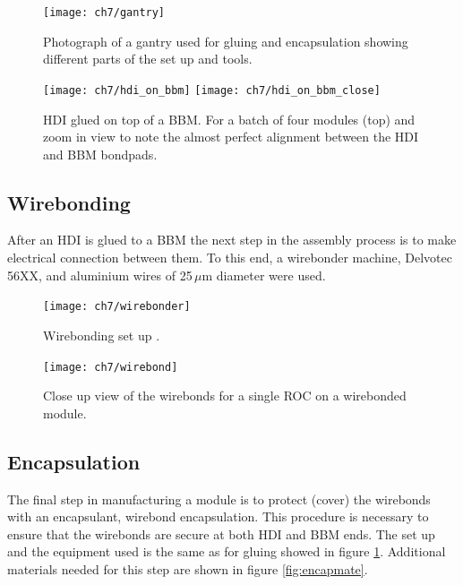 \begin{figure}[!h]
	\centering
	\texttt{[image: ch7/gantry]}
	\caption[Gluing and encapsulation set up]{Photograph of a gantry used for gluing and encapsulation showing different parts of the set up and tools. }
	\label{fig:gantry}
\end{figure}

\begin{figure}[!h]
	\centering
	\texttt{[image: ch7/hdi\_on\_bbm]}
	\texttt{[image: ch7/hdi\_on\_bbm\_close]}
	\caption[Gluing result]{HDI glued on top of a BBM. For a batch of four modules (top) and zoom in view to note the almost perfect alignment between the HDI and BBM bondpads.}
	\label{fig:hdionbbm}
\end{figure}


\subsection{Wirebonding}
After an HDI is glued to a BBM the next step in the assembly process is to make electrical connection between them. To this end, a wirebonder machine, Delvotec 56XX, and aluminium wires of 25\,$\mu$m diameter were used. {}

\begin{figure}[!h]
	\centering
  	\texttt{[image: ch7/wirebonder]}
  	\caption[wirebonder machine]{Wirebonding set up {}.}
  	\label{fig:wirebonder}
\end{figure}


\begin{figure}[!h]
  	\centering
  	\texttt{[image: ch7/wirebond]}
  	\caption[Wirebonded module]{Close up view of the wirebonds for a single ROC on a wirebonded module.}
  	\label{fig:wirebond}
\end{figure}



\subsection{Encapsulation}
The final step in manufacturing a module is to protect (cover) the wirebonds with an encapsulant, wirebond encapsulation. This procedure is necessary to ensure that the wirebonds are secure at both HDI and BBM ends. The set up and the equipment used is the same as for gluing showed in figure \ref{fig:gantry}. Additional materials needed for this step are shown in figure \ref{fig:encapmate}. 
 
